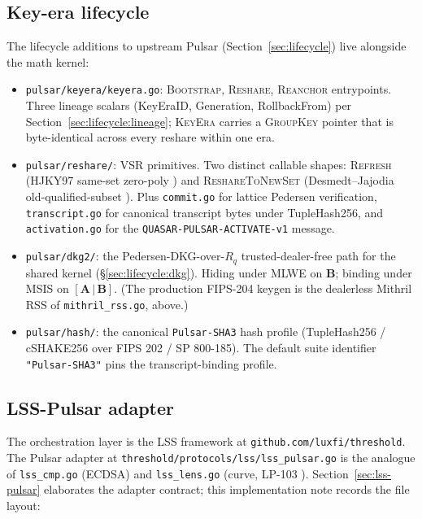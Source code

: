 \subsection{Key-era lifecycle}

The lifecycle additions to upstream Pulsar (Section~\ref{sec:lifecycle}) live alongside the math kernel:

\begin{itemize}
\item \texttt{pulsar/keyera/keyera.go}: \textsc{Bootstrap}, \textsc{Reshare}, \textsc{Reanchor} entrypoints. Three lineage scalars (\textsf{KeyEraID}, \textsf{Generation}, \textsf{RollbackFrom}) per Section~\ref{sec:lifecycle:lineage}; \textsc{KeyEra} carries a \textsc{GroupKey} pointer that is byte-identical across every reshare within one era.
\item \texttt{pulsar/reshare/}: VSR primitives. Two distinct callable shapes: \textsc{Refresh} (HJKY97 same-set zero-poly \cite{hjky97}) and \textsc{ReshareToNewSet} (Desmedt--Jajodia old-qualified-subset \cite{desmedtjajodia97}). Plus \texttt{commit.go} for lattice Pedersen verification, \texttt{transcript.go} for canonical transcript bytes under TupleHash256, and \texttt{activation.go} for the \texttt{QUASAR-PULSAR-ACTIVATE-v1} message.
\item \texttt{pulsar/dkg2/}: the Pedersen-DKG-over-$R_q$ trusted-dealer-free path for the shared kernel (\S\ref{sec:lifecycle:dkg}). Hiding under MLWE on $\mathbf{B}$; binding under MSIS on $[\mathbf{A}\,|\,\mathbf{B}]$. (The production FIPS-204 keygen is the dealerless Mithril RSS of \texttt{mithril\_rss.go}, above.)
\item \texttt{pulsar/hash/}: the canonical \texttt{Pulsar-SHA3} hash profile (TupleHash256 / cSHAKE256 over FIPS 202 / SP 800-185). The default suite identifier \texttt{"Pulsar-SHA3"} pins the transcript-binding profile.
\end{itemize}

\subsection{LSS-Pulsar adapter}

The orchestration layer is the LSS framework \cite{luxlssmpc,lp077} at \texttt{github.com/luxfi/threshold}. The Pulsar adapter at \texttt{threshold/protocols/lss/lss\_pulsar.go} is the analogue of \texttt{lss\_cmp.go} (ECDSA) and \texttt{lss\_lens.go} (curve, LP-103 \cite{lp103}). Section~\ref{sec:lss-pulsar} elaborates the adapter contract; this implementation note records the file layout:

